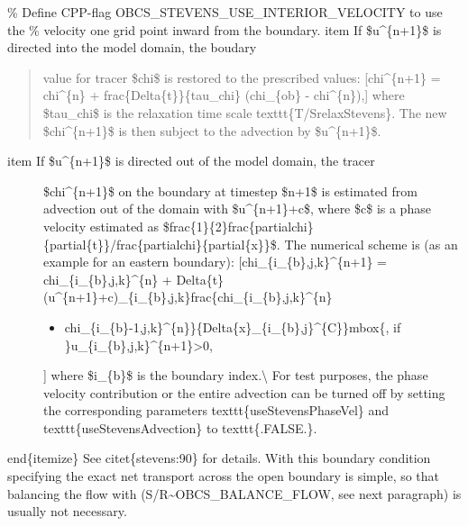 \documentclass[letterpaper,10pt,english]{sphinxmanual}
\begin{document}
\%  Define CPP-flag OBCS\_STEVENS\_USE\_INTERIOR\_VELOCITY to use the
\%  velocity one grid point inward from the boundary.
item If \$u\textasciicircum{}\{n+1\}\$ is directed into the model domain, the boudary
\begin{quote}

value for tracer \$chi\$ is restored to the prescribed values:
{[}chi\textasciicircum{}\{n+1\} =   chi\textasciicircum{}\{n\} + frac\{Delta\{t\}\}\{tau\_chi\} (chi\_\{ob\} -
chi\textasciicircum{}\{n\}),{]} where \$tau\_chi\$ is the relaxation time
scale texttt\{T/SrelaxStevens\}. The new \$chi\textasciicircum{}\{n+1\}\$ is then subject
to the advection by \$u\textasciicircum{}\{n+1\}\$.
\end{quote}
\begin{description}
\item[{item If \$u\textasciicircum{}\{n+1\}\$ is directed out of the model domain, the tracer}] \leavevmode
\$chi\textasciicircum{}\{n+1\}\$ on the boundary at timestep \$n+1\$ is estimated from
advection out of the domain with \$u\textasciicircum{}\{n+1\}+c\$, where \$c\$ is
a phase velocity estimated as
\$frac\{1\}\{2\}frac\{partialchi\}\{partial\{t\}\}/frac\{partialchi\}\{partial\{x\}\}\$. The
numerical scheme is (as an example for an eastern boundary):
{[}chi\_\{i\_\{b\},j,k\}\textasciicircum{}\{n+1\} =   chi\_\{i\_\{b\},j,k\}\textasciicircum{}\{n\} + Delta\{t\}
(u\textasciicircum{}\{n+1\}+c)\_\{i\_\{b\},j,k\}frac\{chi\_\{i\_\{b\},j,k\}\textasciicircum{}\{n\}
\begin{itemize}
\item {} 
chi\_\{i\_\{b\}-1,j,k\}\textasciicircum{}\{n\}\}\{Delta\{x\}\_\{i\_\{b\},j\}\textasciicircum{}\{C\}\}mbox\{, if \}u\_\{i\_\{b\},j,k\}\textasciicircum{}\{n+1\}\textgreater{}0,

\end{itemize}

{]} where \$i\_\{b\}\$ is the boundary index.\textbackslash{}
For test purposes, the phase velocity contribution or the entire
advection can be turned off by setting the corresponding parameters
texttt\{useStevensPhaseVel\} and texttt\{useStevensAdvection\} to
texttt\{.FALSE.\}.

\end{description}

end\{itemize\}
See citet\{stevens:90\} for details. With this boundary condition
specifying the exact net transport across the open boundary is simple,
so that balancing the flow with (S/R\textasciitilde{}OBCS\_BALANCE\_FLOW, see next
paragraph) is usually not necessary.
\end{document}

